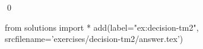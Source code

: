 
\begin{ex} 
  \label{ex:decision-tm2}
  
  \qed
\end{ex} 
\begin{python0}
from solutions import *
add(label="ex:decision-tm2",
    srcfilename='exercises/decision-tm2/answer.tex') 
\end{python0}
